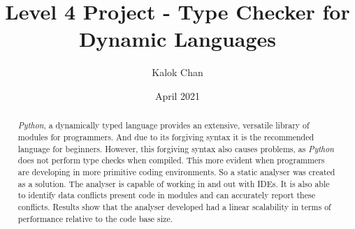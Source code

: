 \documentclass{l4proj}
\begin{document}
\title{Level 4 Project - Type Checker for Dynamic Languages}
\author{Kalok Chan}
\date{April 2021}

\maketitle

\begin{abstract}
\emph{Python}, a dynamically typed language provides an extensive, versatile library of modules for programmers. And due to its forgiving syntax it is the recommended language for beginners. However, this forgiving syntax also causes problems, as \emph{Python} does not perform type checks when compiled. This more evident when programmers are developing in more primitive coding environments. So a static analyser was created as a solution. The analyser is capable of working in and out with IDEs. It is also able to identify data conflicts present code in modules and can accurately report these conflicts. Results show that the analyser developed had a linear scalability in terms of performance relative to the code base size.
\end{abstract}


%
%
%
\educationalconsent


\tableofcontents
\end{document}
